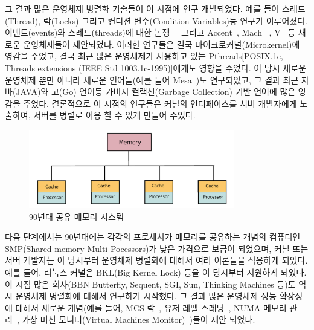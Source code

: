 그 결과 많은 운영체제 병렬화 기술들이 이 시점에 연구 개발되었다. 
예를 들어 스레드(Thread), 락(Locks) 그리고 컨디션 변수(Condition Variables)등 연구가 이루어졌다.
이벤트(events)와 스레드(threads)에 대한 논쟁~\cite{Ous96}~\cite{vonBehren2003WEB} 그리고
Accent~\cite{Rashid1981ACO}, Mach~\cite{Accetta86mach} , V~\cite{Cheriton1983DVK} 등 새로운 
운영체제들이 제안되었다. 
이러한 연구들은 결국 마이크로커널(Microkernel)에 영감을 주었고, 결국 최근 많은 운영체제가 사용하고 있는 
Pthreads[POSIX.1c, Threads extensions (IEEE Std 1003.1c-1995)]에게도 영향을 주었다. 
이 당시 새로운 운영체제 뿐만 아니라 새로운 언어들(예를 들어 Mesa~\cite{Lampson1979EPM})도 
연구되었고, 그 결과 최근 자바(JAVA)와 고(Go) 언어등 가비지 컬랙션(Garbage Collection) 기반 언어에 많은 영감을 주었다.
결론적으로 이 시점의 연구들은 커널의 인터페이스를 서버 개발자에게 노출하여, 서버를 
병렬로 이용 할 수 있게 만들어 주었다.

\begin{figure}[h!]
    \centering
    \includegraphics[width=0.8\textwidth]{fig/shared_memory}
    \caption{90년대 공유 메모리 시스템}
  \label{shared_memory}
\end{figure}

다음 단계에서는 90년대에는 각각의 프로세서가 메모리를 공유하는 개념의 컴퓨터인 SMP(Shared-memory Multi
Pocessors)가 낮은 가격으로 보급이 되었으며, 커널 또는 서버 개발자는 이 당시부터 
운영체제 병렬화에 대해서 여러 이론들을 적용하게 되었다.
예를 들어, 리눅스 커널은 BKL(Big Kernel Lock) 등을 이 당시부터 지원하게 되었다.
이 시점 많은 회사(BBN Butterfly, Sequent, SGI, Sun, Thinking Machines 등)도 역시 운영체제 병렬화에
대해서 연구하기 시작했다.
그 결과 많은 운영체제 성능 확장성에 대해서 새로운 개념(예를 들어, 
MCS 락~\cite{MellorCrummey1991MCS}, 유저 레벨 스레딩~\cite{Marsh1991FUT}, NUMA 메모리
관리~\cite{Bolosky1991NPR}, 가상 머신 모니터(Virtual Machines
Monitor)~\cite{Bugnion1997DRC})들이 제안 되었다.  

